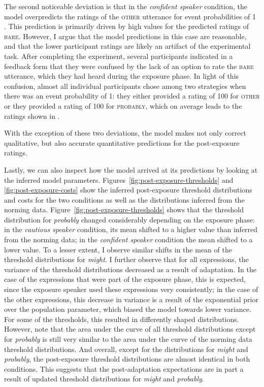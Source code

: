 The second noticeable deviation is that in the \textit{confident speaker} condition, the model overpredicts the ratings of the \textsc{other} utterance for event probabilities of 1 . This prediction is primarily driven by high values for the predicted ratings of \textsc{bare}. However, I argue that the model predictions in this case are reasonable, and that the lower participant ratings are likely an artifact of the experimental task. After completing the experiment, 
several participants indicated in a feedback form that they were confused by the lack of an option to rate the \textsc{bare} utterance, 
which they had heard during the exposure phase. In light of this confusion, almost all individual participants chose among two strategies when there was an event probability of 1: they either provided a rating of 100 for \textsc{other} 
or they provided a rating of 100 for \textsc{probably}, which on average leads to the ratings shown in .

With the exception of these two deviations, the model makes not only correct qualitative, but also accurate quantitative predictions for the post-exposure ratings.

Lastly, we can also inspect how the model arrived at its predictions by looking at the inferred model parameters.  
Figures~\ref{fig:post-exposure-thresholds} and \ref{fig:post-exposure-costs} show the inferred
post-exposure threshold distributions and costs for the two conditions as well as the distributions inferred from the norming data.
Figure~\ref{fig:post-exposure-thresholds} shows that the threshold distribution for \textit{probably}
changed considerably depending on the exposure phase: in the \textit{cautious speaker} condition,
its mean shifted to a higher value than  inferred from the norming data; in the \textit{confident speaker} condition the mean 
shifted to a lower value. To a lesser extent, I observe similar shifts in the mean of the threshold
distributions for \textit{might}. I further observe that for all expressions, the variance of the threshold
distributions decreased as a result of adaptation. In the case of the expressions that were part of the exposure
phase, this is expected, since the exposure speaker used these expressions very consistently; in the case of the
other expressions, this decrease in variance is a result of the exponential prior over the population parameter,
which biased the model towards lower variance. For some of the thresholds, this resulted in differently shaped distributions.
However, note that the area under the curve of all threshold distributions except for \textit{probably} is still very similar to the 
area under the curve of the norming data threshold distributions. And overall, except for the distributions
for \textit{might} and \textit{probably}, the post-exposure threshold distributions are almost identical in both conditions.
This suggests that the post-adaptation expectations 
are in part a result of updated threshold distributions for \textit{might} and \textit{probably}.

